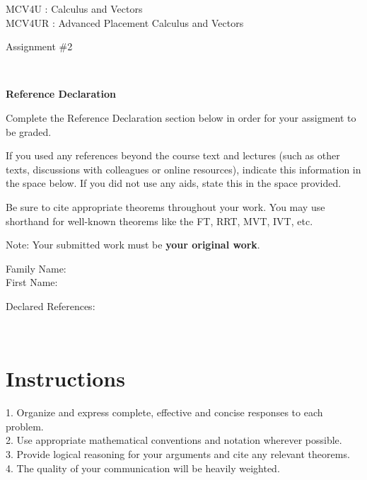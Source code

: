\documentclass[12pt]{book}
\begin{document}
\vspace{-1.0in}\begin{center}
\Large{MCV4U : Calculus and Vectors}\\
\Large{MCV4UR : Advanced Placement Calculus and Vectors }

\Large{Assignment \#2}


\end{center}


\vspace{0.015in}\hrulefill\ 

\textbf{Reference Declaration} %

Complete the Reference Declaration section below in order for your assigment to be graded.

If you used any references beyond the course text and lectures (such as other texts, discussions with colleagues or online resources), indicate this information in the space below.  If you did not use any aids, state this in the space provided. 

Be sure to cite appropriate theorems throughout your work. You may use shorthand for well-known theorems like the FT, RRT, MVT, IVT, etc. 

Note: Your submitted work must be \textbf{your original work}. 

Family Name: \\%
First Name: %

Declared References: 


\vspace{0.015in}\hrulefill\ 

\newpage

\section*{Instructions}

\begin{center}
\setlength{\fboxrule}{2pt}
\begin{boxedminipage}{6.5in}
1.	Organize and express complete, effective and concise responses to each problem.\\
2.	Use appropriate mathematical conventions and notation wherever possible.\\
3.	Provide logical reasoning for your arguments and cite any relevant theorems. \\
4.  The quality of your communication will be heavily weighted.
\end{boxedminipage}
\end{center} 
\end{document}
